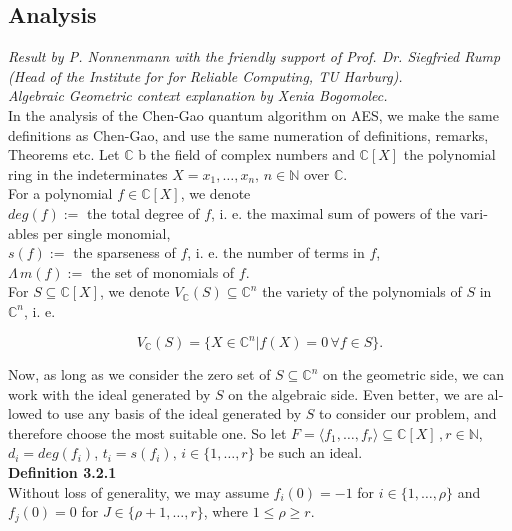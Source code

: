 \documentclass[a4paper,11pt]{article}
\begin{document}
\begin{otherlanguage}{english}
\subsection{Analysis}
\noindent 
{\small \textit{Result by P. Nonnenmann with the friendly support of Prof. Dr. Siegfried Rump (Head of the Institute for for Reliable Computing, TU Harburg). \\
Algebraic Geometric context explanation by Xenia Bogomolec.}}\\

\noindent
In the analysis of the Chen-Gao quantum algorithm on \textsc{AES}, we make the same definitions as Chen-Gao, and use the same numeration of definitions, remarks, Theorems  etc. Let $\mathbb{C}$ b the field of complex numbers and $\mathbb{C}[X]$ the polynomial ring in the indeterminates $X = x_1, \ldots, x_n, \, n \in \mathbb{N}$ over $\mathbb{C}$. \\

\noindent
For a polynomial $f \in \mathbb{C}[X]$, we denote \\

\noindent
$deg(f) :=$ the total degree of $f$, i. e. the maximal sum of powers of the variables per single monomial,\\
\noindent
$s(f) :=$ the sparseness of $f$, i. e. the number of terms in $f$, \\
\noindent
$\Lambda \, m(f) :=$ the set of monomials of $f$. \\

\noindent
For $S \subseteq \mathbb{C}[X]$, we denote $V_{\mathbb{C}}(S) \subseteq \mathbb{C}^n$ the variety of the polynomials of $S$ in $\mathbb{C}^n$, i. e. 

$$V_{\mathbb{C}}(S) = \{ X \in \mathbb{C}^n | f(X) = 0 \, \forall f \in S\}.$$
\vspace{0.1cm}

\noindent
Now, as long as we consider the zero set of $S \subseteq \mathbb{C}^n$ on the geometric side, we can work with the ideal generated by $S$ on the algebraic side. Even better, we are allowed to use any basis of the ideal generated by $S$ to consider our problem, and therefore choose the most suitable one. So let $F = \langle f_1, \ldots, f_r \rangle \subseteq \mathbb{C}[X]\, , r \in \mathbb{N}$, $d_i = deg(f_i)$, $t_i = s(f_i), \, i \in \{1, \ldots, r\}$ be such an ideal.\\

\noindent
\textbf{Definition 3.2.1}\\
Without loss of generality, we may assume $f_i(0) = -1$ for $i \in \{1, \ldots, \rho \}$ and $f_j(0) = 0$ for $J \in \{\rho + 1, \ldots, r \}$, where $1 \leq \rho \geq r$. \\


\end{otherlanguage}
\end{document}
